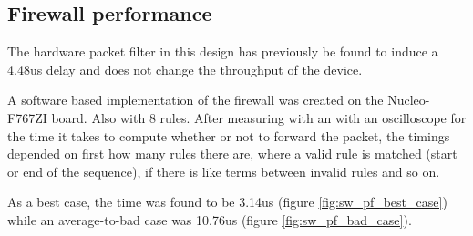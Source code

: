 \subsection{Firewall performance}

The hardware packet filter in this design has previously be found to induce a 4.48us delay and does not change the throughput of the device. 

A software based implementation of the firewall was created on the Nucleo-F767ZI board. Also with 8 rules. After measuring with an with an oscilloscope for the time it takes to compute whether or not to forward the packet, the timings depended on first how many rules there are, where a valid rule is matched (start or end of the sequence), if there is like terms between invalid rules and so on. 

As a best case, the time was found to be 3.14us (figure \ref{fig:sw_pf_best_case}) while an average-to-bad case was 10.76us (figure \ref{fig:sw_pf_bad_case}).



